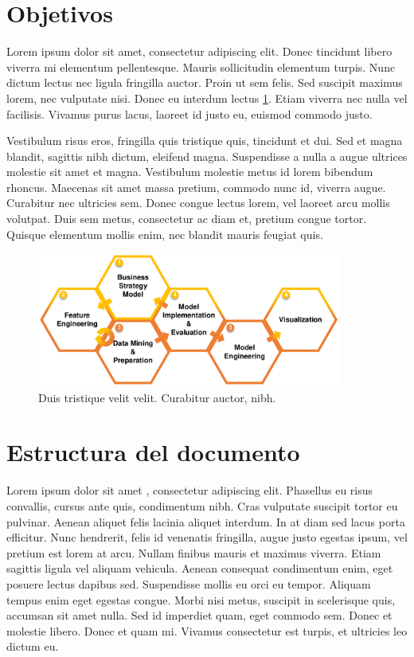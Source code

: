 \section{Objetivos}\label{sec:objetivos}
Lorem ipsum dolor sit amet, consectetur adipiscing elit. Donec tincidunt libero viverra mi elementum pellentesque. Mauris sollicitudin elementum turpis. Nunc dictum lectus nec ligula fringilla auctor. Proin ut sem felis. Sed suscipit maximus lorem, nec vulputate nisi. Donec eu interdum lectus \ref{fig:figure1}. Etiam viverra nec nulla vel facilisis. Vivamus purus lacus, laoreet id justo eu, euismod commodo justo.\par

Vestibulum risus eros, fringilla quis tristique quis, tincidunt et dui. Sed et magna blandit, sagittis nibh dictum, eleifend magna. Suspendisse a nulla a augue ultrices molestie sit amet et magna. Vestibulum molestie metus id lorem bibendum rhoncus. Maecenas sit amet massa pretium, commodo nunc id, viverra augue. Curabitur nec ultricies sem. Donec congue lectus lorem, vel laoreet arcu mollis volutpat. Duis sem metus, consectetur ac diam et, pretium congue tortor. Quisque elementum mollis enim, nec blandit mauris feugiat quis.\par

\begin{figure}[h]
    \centering
    \captionsetup{width=10cm}
    \includegraphics[width=10cm]{contenido/img/DDSD.pdf}
    \caption{Duis tristique velit velit. Curabitur auctor, nibh.}
    \label{fig:figure1}
\end{figure}

\section{Estructura del documento}\label{sec:estructura}
Lorem ipsum dolor sit amet \cite{entry2013one}, consectetur adipiscing elit. Phasellus eu risus convallis, cursus ante quis, condimentum nibh. Cras vulputate suscipit tortor eu pulvinar. Aenean aliquet felis lacinia aliquet interdum. In at diam sed lacus porta efficitur. Nunc hendrerit, felis id venenatis fringilla, augue justo egestas ipsum, vel pretium est lorem at arcu. Nullam finibus mauris et maximus viverra. Etiam sagittis ligula vel aliquam vehicula. Aenean consequat condimentum enim, eget posuere lectus dapibus sed. Suspendisse mollis  eu orci eu tempor. Aliquam tempus enim eget egestas congue. Morbi nisi metus, suscipit in scelerisque quis, accumsan sit amet nulla. Sed id imperdiet quam, eget commodo sem. Donec et molestie libero. Donec et quam mi. Vivamus consectetur est turpis, et ultricies leo dictum eu.\par

